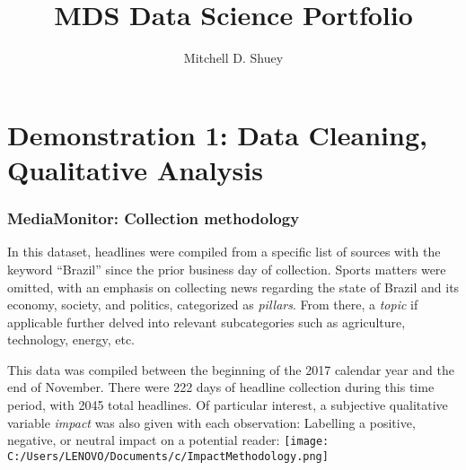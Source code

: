 \documentclass[]{article}
\title{MDS Data Science Portfolio}
\author{Mitchell D. Shuey}
\date{}
\newenvironment{Shaded}{\begin{snugshade}}{\end{snugshade}}
\newcommand{\KeywordTok}[1]{\textcolor[rgb]{0.13,0.29,0.53}{\textbf{#1}}}
\newcommand{\DataTypeTok}[1]{\textcolor[rgb]{0.13,0.29,0.53}{#1}}
\newcommand{\StringTok}[1]{\textcolor[rgb]{0.31,0.60,0.02}{#1}}
\newcommand{\CommentTok}[1]{\textcolor[rgb]{0.56,0.35,0.01}{\textit{#1}}}
\newcommand{\OperatorTok}[1]{\textcolor[rgb]{0.81,0.36,0.00}{\textbf{#1}}}
\newcommand{\NormalTok}[1]{#1}
\begin{document}
\maketitle

\section{Demonstration 1: Data Cleaning, Qualitative
Analysis}\label{demonstration-1-data-cleaning-qualitative-analysis}

\subsubsection{MediaMonitor: Collection
methodology}\label{mediamonitor-collection-methodology}

In this dataset, headlines were compiled from a specific list of sources
with the keyword ``Brazil'' since the prior business day of collection.
Sports matters were omitted, with an emphasis on collecting news
regarding the state of Brazil and its economy, society, and politics,
categorized as \emph{pillars}. From there, a \emph{topic} if applicable
further delved into relevant subcategories such as agriculture,
technology, energy, etc.

This data was compiled between the beginning of the 2017 calendar year
and the end of November. There were 222 days of headline collection
during this time period, with 2045 total headlines. Of particular
interest, a subjective qualitative variable \emph{impact} was also given
with each observation: Labelling a positive, negative, or neutral impact
on a potential reader:
\texttt{[image: C:/Users/LENOVO/Documents/c/ImpactMethodology.png]}

\begin{Shaded}
\end{Shaded}
\end{document}
